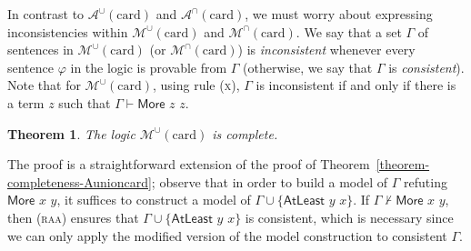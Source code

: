 \documentclass[letterpaper]{article} %
\newtheorem{theorem}{Theorem}[section]
\theoremstyle{definition}
\newcommand{\set}[1]{\{ #1 \}}
\newcommand{\proves}{\vdash}
\newcommand{\Aunion}{\mathscr{A}^{\cup}}
\newcommand{\Munion}{\mathscr{M}^{\cup}}
\newcommand{\Ainter}{\mathscr{A}^{\cap}}
\newcommand{\Minter}{\mathscr{M}^{\cap}}
\newcommand{\proverule}{\textsc}
\newcommand{\x}{\proverule{x}}
\newcommand{\raa}{\proverule{raa}}
\newcommand{\Atleast}[2]{\mathsf{AtLeast}\,\,#1\,\,#2}
\newcommand{\More}[2]{\mathsf{More}\,\,#1\,\,#2}
\newcommand{\card}{\mathrm{card}}
\begin{document}
In contrast to $\Aunion(\card)$ and $\Ainter(\card)$, we must worry about expressing inconsistencies within $\Munion(\card)$ and $\Minter(\card)$.  We say that a set $\Gamma$ of sentences in $\Munion(\card)$ (or $\Minter(\card)$) is \emph{inconsistent} whenever every sentence $\varphi$ in the logic is provable from $\Gamma$ (otherwise, we say that $\Gamma$ is \emph{consistent}).  Note that for $\Munion(\card)$, using rule (\x), $\Gamma$ is inconsistent if and only if there is a term $z$ such that $\Gamma \proves \More{z}{z}$.

\begin{theorem}
The logic $\Munion(\card)$ is complete.
\label{theorem-completeness-Munioncard}
\end{theorem}

The proof is a straightforward extension of the proof of Theorem~\ref{theorem-completeness-Aunioncard}; observe that in order to build a model of $\Gamma$ refuting $\More{x}{y}$, it suffices to construct a model of $\Gamma \cup \set{\Atleast{y}{x}}$. If $\Gamma\not\vdash \More{x}{y}$, then (\raa) ensures that $\Gamma \cup \set{\Atleast{y}{x}}$ is consistent, which is necessary since we can only apply the modified version of the model construction to consistent $\Gamma$. %
\end{document}
